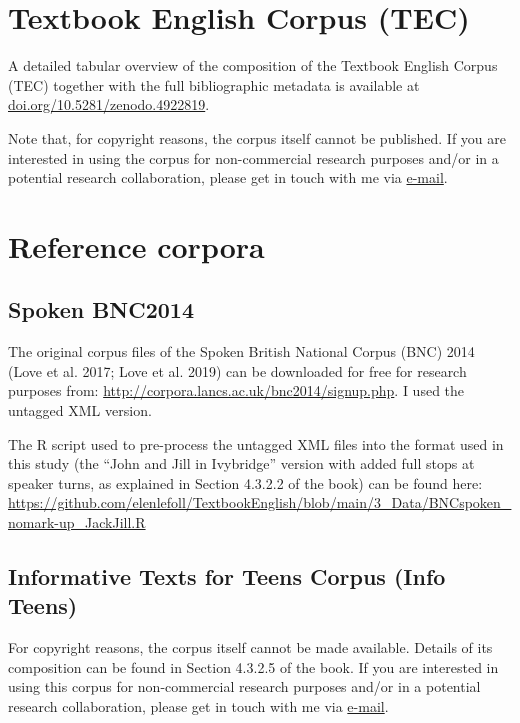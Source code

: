 \documentclass[
  letterpaper,
  DIV=11,
  numbers=noendperiod]{scrreprt}
\begin{document}
\section{Textbook English Corpus
(TEC)}\label{textbook-english-corpus-tec}

A detailed tabular overview of the composition of the Textbook English
Corpus (TEC) together with the full bibliographic metadata is available
at
\href{https://doi.org/10.5281/zenodo.4922819}{doi.org/10.5281/zenodo.4922819}.

Note that, for copyright reasons, the corpus itself cannot be published.
If you are interested in using the corpus for non-commercial research
purposes and/or in a potential research collaboration, please get in
touch with me via \href{https://orcid.org/0000-0002-5839-8010}{e-mail}.

\section{Reference corpora}\label{reference-corpora}

\subsection{Spoken BNC2014}\label{spoken-bnc2014}

The original corpus files of the Spoken British National Corpus (BNC)
2014 (Love et al. 2017; Love et al. 2019) can be downloaded for free for
research purposes from:
\url{http://corpora.lancs.ac.uk/bnc2014/signup.php}. I used the untagged
XML version.

The R script used to pre-process the untagged XML files into the format
used in this study (the ``John and Jill in Ivybridge'' version with
added full stops at speaker turns, as explained in Section 4.3.2.2 of
the book) can be found here:
\url{https://github.com/elenlefoll/TextbookEnglish/blob/main/3_Data/BNCspoken_nomark-up_JackJill.R}

\subsection{Informative Texts for Teens Corpus (Info
Teens)}\label{informative-texts-for-teens-corpus-info-teens}

For copyright reasons, the corpus itself cannot be made available.
Details of its composition can be found in Section 4.3.2.5 of the book.
If you are interested in using this corpus for non-commercial research
purposes and/or in a potential research collaboration, please get in
touch with me via \href{https://orcid.org/0000-0002-5839-8010}{e-mail}.
\end{document}
